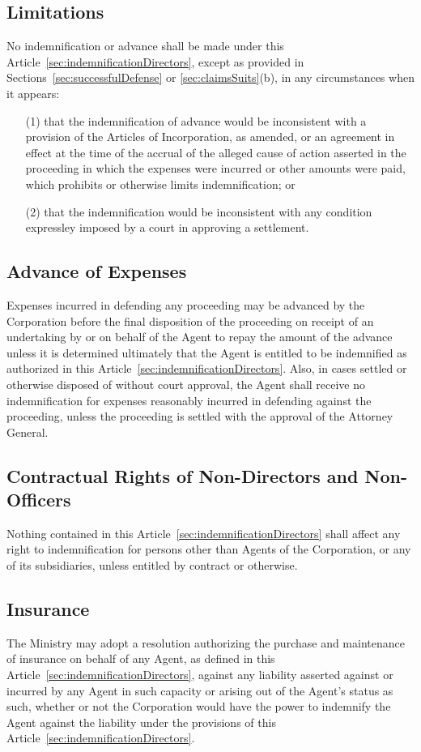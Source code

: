 \documentclass[letterpaper,titlepage]{article}
\begin{document}
\subsection{Limitations}
\label{sec:limitations2}
No indemnification or advance shall be made under this
Article~\ref{sec:indemnificationDirectors}, except as provided in
Sections~\ref{sec:successfulDefense} or \ref{sec:claimsSuits}(b), in any circumstances when it appears:
\begin{itemize}
    \item[(1)] that the indemnification of advance would be inconsistent with a
        provision of the Articles of Incorporation, as amended, or an agreement
        in effect at the time of the accrual of the alleged cause of action
        asserted in the proceeding in which the expenses were incurred or other
        amounts were paid, which prohibits or otherwise limits indemnification;
        or
    \item[(2)] that the indemnification would be inconsistent with any condition
        expressley imposed by a court in approving a settlement.
\end{itemize}
\subsection{Advance of Expenses}
\label{sec:advanceExpenses}
Expenses incurred in defending any proceeding may be advanced by the
Corporation before the final disposition of the proceeding on receipt of an
undertaking by or on behalf of the Agent to repay the amount of the advance
unless it is determined ultimately that the Agent is entitled to be indemnified
as authorized in this Article~\ref{sec:indemnificationDirectors}. Also, in cases settled or otherwise disposed of without court approval, the Agent shall receive no indemnification for expenses reasonably incurred in defending against the proceeding, unless the proceeding is settled with the approval of the Attorney General.
\subsection{Contractual Rights of Non-Directors and Non-Officers}
\label{sec:contractualRights}
Nothing contained in this Article~\ref{sec:indemnificationDirectors} shall affect any right to indemnification for persons other than Agents of the Corporation, or any of its subsidiaries, unless entitled by contract or otherwise.
\subsection{Insurance}
\label{sec:insurance}
The Ministry may adopt a resolution authorizing the purchase and maintenance of
insurance on behalf of any Agent, as defined in this
Article~\ref{sec:indemnificationDirectors}, against any liability asserted against
or incurred by any Agent in such capacity or arising out of the Agent's status
as such, whether or not the Corporation would have the power to indemnify the
Agent against the liability under the provisions of this
Article~\ref{sec:indemnificationDirectors}.
\end{document}
